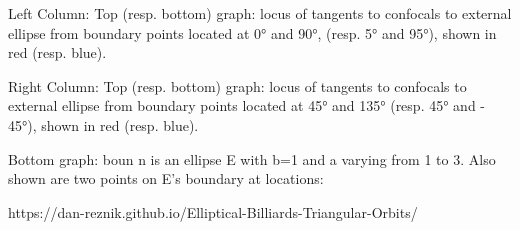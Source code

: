 Left Column: Top (resp. bottom) graph: locus of tangents to confocals to external ellipse from boundary points located at 0° and 90°, (resp. 5° and 95°), shown in red (resp. blue).

Right Column: Top (resp. bottom) graph: locus of tangents to confocals to external ellipse from boundary points located at 45° and 135° (resp. 45° and - 45°), shown in red (resp. blue).

Bottom graph: boun n is an ellipse E with b=1 and a varying from 1 to 3. Also shown are two points on E's boundary at locations:

https://dan-reznik.github.io/Elliptical-Billiards-Triangular-Orbits/